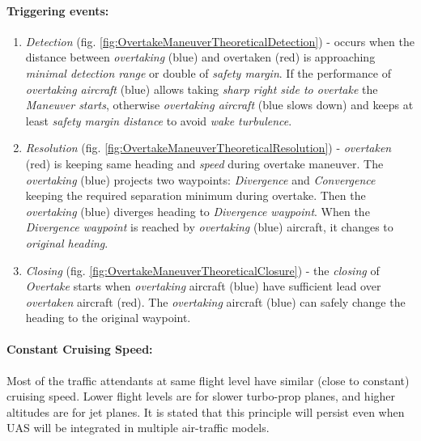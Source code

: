 \newpage
\paragraph{Triggering events:}
\begin{enumerate}
    \item \emph{Detection} (fig. \ref{fig:OvertakeManeuverTheoreticalDetection}) - occurs when the distance between \emph{overtaking} (blue) and overtaken (red) is approaching \emph{minimal detection range} or double of \emph{safety margin}. If the performance of \emph{overtaking aircraft} (blue) allows taking \emph{sharp right side to overtake} the \emph{Maneuver starts}, otherwise \emph{overtaking aircraft} (blue slows down) and keeps at least \emph{safety margin distance} to avoid \emph{wake turbulence}.
    
    \item \emph{Resolution} (fig. \ref{fig:OvertakeManeuverTheoreticalResolution}) - \emph{overtaken} (red) is keeping same heading and \emph{speed} during overtake maneuver. The \emph{overtaking} (blue) projects two waypoints: \emph{Divergence} and \emph{Convergence} keeping the required separation minimum during overtake. Then the \emph{overtaking} (blue) diverges heading to \emph{Divergence waypoint}. When the \emph{Divergence waypoint} is reached by \emph{overtaking} (blue) aircraft, it changes to \emph{original heading}.
    
    \item \emph{Closing} (fig. \ref{fig:OvertakeManeuverTheoreticalClosure}) - the \emph{closing} of \emph{Overtake} starts when \emph{overtaking} aircraft (blue) have sufficient lead over \emph{overtaken} aircraft (red). The \emph{overtaking} aircraft (blue) can safely change the heading to the original waypoint.
\end{enumerate}


\paragraph{Constant Cruising Speed:} Most of the traffic attendants at same flight level have similar (close to constant) cruising speed. Lower flight levels are for slower turbo-prop planes, and higher altitudes are for jet planes. It is stated that this principle will persist even when UAS will be integrated \cite{bayen2005langrangian,kopardekar2002dynamic,helme1992optimization} in multiple air-traffic models.


